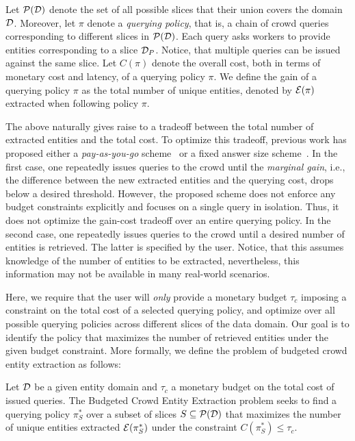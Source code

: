 Let $\mathcal{P}(\mathcal{D})$ denote the set of all possible slices that their union covers the domain $\mathcal{D}$. Moreover, let $\pi$ denote a {\em querying policy}, that is, a chain of crowd queries corresponding to different slices in $\mathcal{P}(\mathcal{D})$. Each query asks workers to provide entities corresponding to a slice $\mathcal{D}_P$. Notice, that multiple queries can be issued against the same slice. Let $C(\pi)$ denote the overall cost, both in terms of monetary cost and latency, of a querying policy $\pi$. We define the gain of a querying policy $\pi$ as the total number of unique entities, denoted by $\mathcal{E}(\pi)$ extracted when following policy $\pi$. 

The above naturally gives raise to a tradeoff between the total number of extracted entities and the total cost. To optimize this tradeoff, previous work has proposed either a {\em pay-as-you-go} scheme~\cite{trushkowsky:2013} or a fixed answer size scheme~\cite{park:2014}. In the first case, one repeatedly issues queries to the crowd until the {\em marginal gain}, i.e., the difference between the new extracted entities and the querying cost, drops below a desired threshold. However, the proposed scheme does not enforce any budget constraints explicitly and focuses on a single query in isolation. Thus, it does not optimize the gain-cost tradeoff over an entire querying policy. In the second case, one repeatedly issues queries to the crowd until a desired number of entities is retrieved. The latter is specified by the user. Notice, that this assumes knowledge of the number of entities to be extracted, nevertheless, this information may not be available in many real-world scenarios. 

Here, we require that the user will {\em only} provide a monetary budget $\tau_c$ imposing a constraint on the total cost of a selected querying policy, and optimize over all possible querying policies across different slices of the data domain. Our goal is to identify the policy that maximizes the number of retrieved entities under the given budget constraint. More formally, we define the problem of budgeted crowd entity extraction as follows:

\begin{definition}
Let $\mathcal{D}$ be a given entity domain and $\tau_c$ a monetary budget on the total cost of issued queries. The Budgeted Crowd Entity Extraction problem seeks to find 
a querying policy $\pi^*_S$ over a subset of slices $S \subseteq \mathcal{P}(\mathcal{D})$ that maximizes the number of unique entities extracted $\mathcal{E}(\pi^*_S)$ under the constraint $C(\pi^*_S) \leq \tau_c$.
\end{definition}

